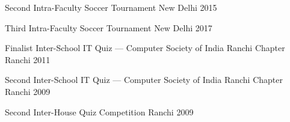 

\begin{cvhonours}

\cvhonour%
  {Second} %
  {Intra-Faculty Soccer Tournament} %
  {New Delhi} %
  {2015} %

\cvhonour%
  {Third} %
  {Intra-Faculty Soccer Tournament} %
  {New Delhi} %
  {2017} %

\end{cvhonours}


\begin{cvhonours}

\cvhonour%
  {Finalist} %
  {Inter-School IT Quiz --- Computer Society of India Ranchi Chapter} %
  {Ranchi} %
  {2011} %

\cvhonour%
  {Second} %
  {Inter-School IT Quiz --- Computer Society of India Ranchi Chapter} %
  {Ranchi} %
  {2009} %

\cvhonour%
  {Second} %
  {Inter-House Quiz Competition} %
  {Ranchi} %
  {2009} %

\end{cvhonours}
